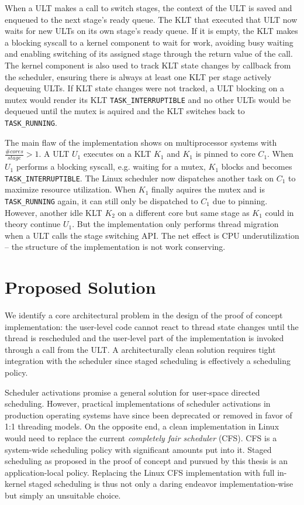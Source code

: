 \documentclass{article}
\begin{document}
When a ULT makes a call to switch stages, the context of the ULT is saved and enqueued to the next stage's ready queue.
The KLT that executed that ULT now waits for new ULTs on its own stage's ready queue.
If it is empty, the KLT makes a blocking syscall to a kernel component to wait for work, avoiding busy waiting
and enabling switching of its assigned stage through the return value of the call.
The kernel component is also used to track KLT state changes by callback from the scheduler, ensuring there is always at
least one KLT per stage actively dequeuing ULTs.
If KLT state changes were not tracked, a ULT blocking on a mutex would render its KLT
\texttt{TASK\_INTERRUPTIBLE} and no other ULTs would be dequeued until the mutex is aquired and the KLT switches back to
\texttt{TASK\_RUNNING}.

The main flaw of the implementation shows on multiprocessor systems with $\frac{\#cores}{stage} > 1$.
A ULT $U_1$ executes on a KLT $K_1$ and $K_1$ is pinned to core $C_1$.
When $U_1$ performs a blocking syscall, e.g. waiting for a mutex, $K_1$ blocks and becomes \texttt{TASK\_INTERRUPTIBLE}.
The Linux scheduler now dispatches another task on $C_1$ to maximize resource utilization.
When $K_1$ finally aquires the mutex and is \texttt{TASK\_RUNNING} again, it can still only be dispatched to $C_1$ due to
pinning.
However, another idle KLT $K_2$ on a different core but same stage as $K_1$ could in theory continue $U_1$.
But the implementation only performs thread migration when a ULT calls the stage switching API.
The net effect is CPU underutilization -- the structure of the implementation is not work conserving.

\section{Proposed Solution}\label{propsolution}

We identify a core architectural problem in the design of the proof of concept implementation:
the user-level code cannot react to thread state changes until the thread is rescheduled and the user-level part of the
implementation is invoked through a call from the ULT. A architecturally clean solution requires tight integration with
the scheduler since staged scheduling is effectively a scheduling policy.

Scheduler activations promise \cite{schedulerActivations} a general solution for user-space directed scheduling.
However, practical implementations of scheduler activations in production operating systems have since been
deprecated or removed in favor of 1:1 threading models\cite{todo}.
On the opposite end, a clean implementation in Linux would need to replace the current \emph{completely fair scheduler} (CFS).
CFS is a system-wide scheduling policy with significant amounts put into it.
Staged scheduling as proposed in the proof of concept and pursued by this thesis is an application-local policy.
Replacing the Linux CFS implementation with full in-kernel staged scheduling is thus not only a daring
endeavor implementation-wise but simply an unsuitable choice.
\end{document}
